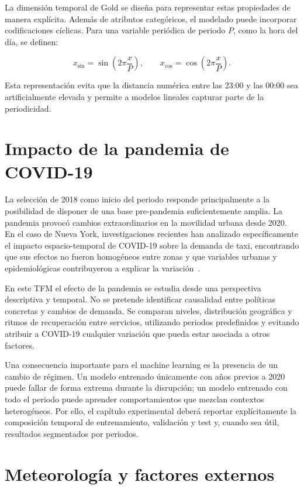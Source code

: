 La dimensión temporal de Gold se diseña para representar estas propiedades de manera explícita. Además de atributos categóricos, el modelado puede incorporar codificaciones cíclicas. Para una variable periódica de periodo \(P\), como la hora del día, se definen:

\begin{equation}
 x_{\sin}=\sin\left(2\pi\frac{x}{P}\right), \qquad
 x_{\cos}=\cos\left(2\pi\frac{x}{P}\right).
\end{equation}

Esta representación evita que la distancia numérica entre las 23:00 y las 00:00 sea artificialmente elevada y permite a modelos lineales capturar parte de la periodicidad.

\section{Impacto de la pandemia de COVID-19}

La selección de 2018 como inicio del periodo responde principalmente a la posibilidad de disponer de una base pre-pandemia suficientemente amplia. La pandemia provocó cambios extraordinarios en la movilidad urbana desde 2020. En el caso de Nueva York, investigaciones recientes han analizado específicamente el impacto espacio-temporal de COVID-19 sobre la demanda de taxi, encontrando que sus efectos no fueron homogéneos entre zonas y que variables urbanas y epidemiológicas contribuyeron a explicar la variación~\cite{zhang2024covid}.

En este TFM el efecto de la pandemia se estudia desde una perspectiva descriptiva y temporal. No se pretende identificar causalidad entre políticas concretas y cambios de demanda. Se comparan niveles, distribución geográfica y ritmos de recuperación entre servicios, utilizando periodos predefinidos y evitando atribuir a COVID-19 cualquier variación que pueda estar asociada a otros factores.

Una consecuencia importante para el machine learning es la presencia de un cambio de régimen. Un modelo entrenado únicamente con años previos a 2020 puede fallar de forma extrema durante la disrupción; un modelo entrenado con todo el periodo puede aprender comportamientos que mezclan contextos heterogéneos. Por ello, el capítulo experimental deberá reportar explícitamente la composición temporal de entrenamiento, validación y test y, cuando sea útil, resultados segmentados por periodos.

\section{Meteorología y factores externos}

